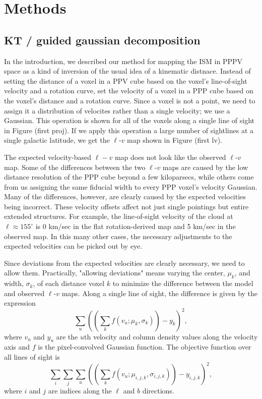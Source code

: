 \section{Methods}

\subsection{KT / guided gaussian decomposition}

In the introduction, we described our method for mapping the ISM in PPPV space as a kind of inversion of the usual idea of a kinematic distnace. Instead of setting the distance of a voxel in a PPV cube based on the voxel's line-of-sight velocity and a rotation curve, set the velocity of a voxel in a PPP cube based on the voxel's distance and a rotation curve. Since a voxel is not a point, we need to assign it a distribution of velocites rather than a single velocity; we use a Gaussian. This operation is shown for all of the voxels along a single line of sight in Figure (first proj). If we apply this operation a large number of sightlines at a single galactic latitude, we get the $\ell$-$v$ map shown in Figure (first lv). 

The expected velocity-based $\ell-v$ map does not look like the observed $\ell$-$v$ map. Some of the differences between the two $\ell$-$v$ maps are  caused by the low distance resolution of the PPP cube beyond a few kiloparsecs, while others come from us assigning the same fiducial width to every PPP voxel's velocity Gaussian. Many of the differences, however, are clearly caused by the expected velocities being incorrect. These velocity offsets affect not just single pointings but entire extended structures. For example, the line-of-sight velocity of the cloud at $\ell \approx 155^\circ$ is 0 km/sec in the flat rotation-derived map and 5 km/sec in the observed map. In this many other cases, the necessary adjustments to the expected velocities can be picked out by eye.

Since deviations from the expected velocities are clearly necessary, we need to allow them. Practically, "allowing deviations" means varying the center, $\mu_k$, and width, $\sigma_k$, of each distance voxel $k$ to minimize the difference between the model and observed $\ell$-$v$ maps. Along a single line of sight, the difference is given by the expression
\begin{equation}
    \sum_u ((\sum_k f(v_u; \mu_k, \sigma_k)) - y_k)^2,
\end{equation}
where $v_u$ and $y_u$ are the $u$th velocity and column density values along the velocity axis and $f$ is the pixel-convolved Gaussian function.
The objective function over all lines of sight is
\begin{equation}
\label{eqn:objective-nosprings}
    \sum_i \sum_j \sum_u ((\sum_k f(v_u; \mu_{i,j,k}, \sigma_{i,j,k})) - y_{i,j,k})^2,
\end{equation}
where $i$ and $j$ are indices along the $\ell$ and $b$ directions. 

